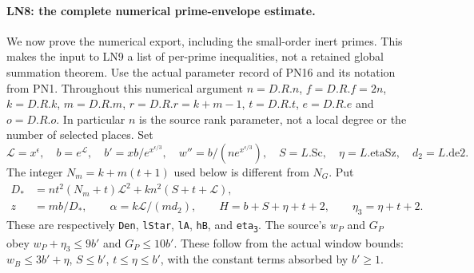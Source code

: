 \paragraph{LN8: the complete numerical prime-envelope estimate.}
\label{claim:LN8}
We now prove the numerical export, including the small-order inert
primes.  This makes the input to LN9 a list of per-prime inequalities,
not a retained global summation theorem.  Use the actual parameter
record of PN16 and its notation from PN1.  Throughout this numerical
argument $n=D.R.n$, $f=D.R.f=2n$, $k=D.R.k$, $m=D.R.m$,
$r=D.R.r=k+m-1$, $t=D.R.t$, $e=D.R.e$ and $o=D.R.o$.
In particular $n$ is the source rank parameter, not a local degree
or the number of selected places.  Set
\[
 \mathcal L=x^\epsilon,\quad b=e^{\mathcal L},\quad
 b'=xb/e^{x^{\epsilon/3}},\quad
 w''=b/(n e^{x^{\epsilon/3}}),\quad S=L.\mathrm{Sc},\quad
 \eta=L.\mathrm{etaSz},\quad d_2=L.\mathrm{de2}.
 \tag{LN.30}
\]
The integer $N_m=k+m(t+1)$ used below is different from $N_G$.
Put
\[
 \begin{split}
 D_*&=nt^2(N_m+t)\mathcal L^2+kn^2(S+t+\mathcal L),\\
 z&=mb/D_*,\qquad \alpha=k\mathcal L/(md_2),\qquad
 H=b+S+\eta+t+2,\qquad \eta_3=\eta+t+2.
 \end{split}                                                   \tag{LN.31}
\]
These are respectively \texttt{Den}, \texttt{lStar}, \texttt{lA},
\texttt{hB}, and \texttt{eta\textsubscript{3}}.  The source's
$w_P$ and $G_P$ obey $w_P+\eta_3\le9b'$ and $G_P\le10b'$.
These follow from the actual window bounds:
$w_B\le3b'+\eta$, $S\le b'$, $t\le\eta\le b'$, with the
constant terms absorbed by $b'\ge1$.

